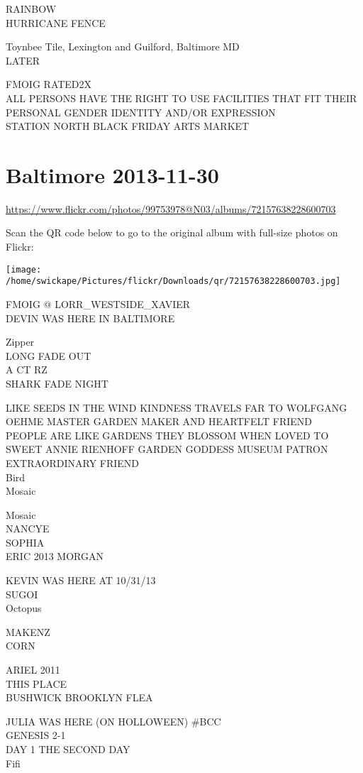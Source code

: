 \documentclass[10pt,letterpaper]{article}
\begin{document}
RAINBOW\\
HURRICANE FENCE

Toynbee Tile, Lexington and Guilford, Baltimore MD\\
LATER

FMOIG RATED2X\\
ALL PERSONS HAVE THE RIGHT TO USE FACILITIES THAT FIT THEIR PERSONAL GENDER IDENTITY AND/OR EXPRESSION\\
STATION NORTH BLACK FRIDAY ARTS MARKET
\pagebreak

\section*{Baltimore 2013-11-30}

\url{https://www.flickr.com/photos/99753978@N03/albums/72157638228600703}

Scan the QR code below to go to the original album with full-size photos on Flickr:

\texttt{[image: /home/swickape/Pictures/flickr/Downloads/qr/72157638228600703.jpg]}
\pagebreak

FMOIG @ LORR\_WESTSIDE\_XAVIER\\
DEVIN WAS HERE IN BALTIMORE

Zipper\\
LONG FADE OUT\\
A CT RZ\\
SHARK FADE NIGHT

LIKE SEEDS IN THE WIND KINDNESS TRAVELS FAR TO WOLFGANG OEHME MASTER GARDEN MAKER AND HEARTFELT FRIEND\\
PEOPLE ARE LIKE GARDENS THEY BLOSSOM WHEN LOVED TO SWEET ANNIE RIENHOFF GARDEN GODDESS MUSEUM PATRON EXTRAORDINARY FRIEND\\
Bird\\
Mosaic

Mosaic\\
NANCYE\\
SOPHIA\\
ERIC 2013 MORGAN

KEVIN WAS HERE AT 10/31/13\\
SUGOI\\
Octopus

MAKENZ\\
CORN

ARIEL 2011\\
THIS PLACE\\
BUSHWICK BROOKLYN FLEA

JULIA WAS HERE (ON HOLLOWEEN) \#BCC\\
GENESIS 2{-}1\\
DAY 1 THE SECOND DAY\\
Fifi
\end{document}
